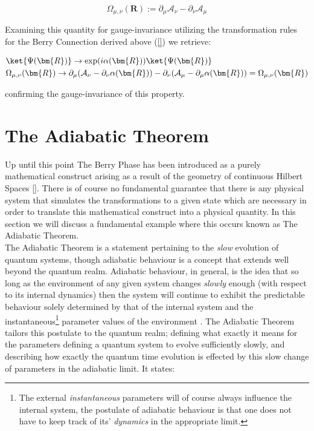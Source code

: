\documentclass{article}
\begin{document}
  \begin{equation*}
    \Omega_{\mu, \nu}(\bm{R}) := \partial_{\mu} \mathcal{A}_{\nu} - \partial_{\nu} \mathcal{A}_{\mu}  
  \end{equation*}

Examining this quantity for gauge-invariance utilizing the transformation rules for the Berry Connection derived above (\ref{}) we retrieve:


       \begin{align*}
         &\ket{\Psi(\bm{R})} \rightarrow \exp(i\alpha(\bm{R}))\ket{\Psi(\bm{R})}\\
         &\Omega_{\mu, \nu}(\bm{R}) \rightarrow \partial_{\mu} (\mathcal{A}_{\nu}
         - \partial_{\nu} \alpha(\bm{R})) - \partial_{\nu}(\mathcal{A}_{\mu} -
         \partial_{\mu} \alpha(\bm{R})) = \Omega_{\mu, \nu}(\bm{R})
      \end{align*}

confirming the gauge-invariance of this property.


\section{The Adiabatic Theorem}\label{sec:adiabatic_theorem}

Up until this point The Berry Phase has been introduced as a purely mathematical construct arising as a result of the geometry of continuous Hilbert Spaces \ref{}. There is of course no fundamental guarantee that there is any physical system that simulates the transformations to a given state which are necessary in order to translate this mathematical construct into a physical quantity. In this section we will discuss a fundamental example where this occurs known as The Adiabatic Theorem.\\

The Adiabatic Theorem is a statement pertaining to the \textit{slow} evolution of quantum systems, though adiabatic behaviour is a concept that extends well beyond the quantum realm. Adiabatic behaviour, in general, is the idea that so long as the environment of any given system changes \textit{slowly} enough (with respect to its internal dynamics) then the system will continue to exhibit the predictable behaviour solely determined by that of the internal system and the instantaneous\footnote{The external \textit{instantaneous} parameters will of course always influence the internal system, the postulate of adiabatic behaviour is that one does not have to keep track of its' \textit{dynamics} in the appropriate limit.} parameter values of the environment \cite{Griffiths2017}. The Adiabatic Theorem tailors this postulate to the quantum realm; defining what exactly it means for the parameters defining a quantum system to evolve sufficiently slowly, and describing how exactly the quantum time evolution is effected by this slow change of parameters in the adiabatic limit. It states:\\
\end{document}
